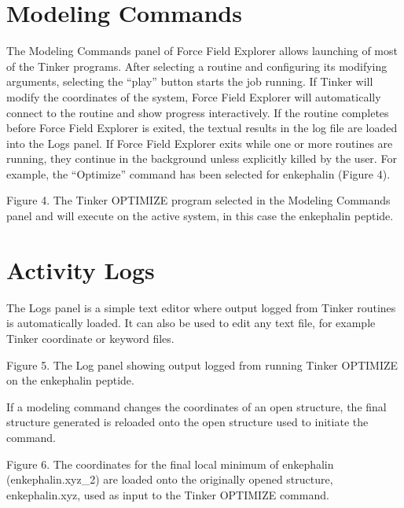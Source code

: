 \documentclass[letterpaper,11pt,english]{sphinxmanual}
\let\sphinxpxdimen\pdfpxdimen\else\newdimen\sphinxpxdimen
\begin{document}
\section{Modeling Commands}
\label{\detokenize{text/components:modeling-commands}}
The Modeling Commands panel of Force Field Explorer allows launching of most of the Tinker programs. After selecting a routine and configuring its modifying arguments, selecting the “play” button starts the job running. If Tinker will modify the coordinates of the system, Force Field Explorer will automatically connect to the routine and show progress interactively. If the routine completes before Force Field Explorer is exited, the textual results in the log file are loaded into the Logs panel. If Force Field Explorer exits while one or more routines are running, they continue in the background unless explicitly killed by the user. For example, the “Optimize” command has been selected for enkephalin (Figure 4).

\noindent\sphinxincludegraphics[width=625\sphinxpxdimen]{{figure4}.png}

Figure 4. The Tinker OPTIMIZE program selected in the Modeling Commands panel and will execute on the active system, in this case the enkephalin peptide.


\section{Activity Logs}
\label{\detokenize{text/components:activity-logs}}
The Logs panel is a simple text editor where output logged from Tinker routines is automatically loaded. It can also be used to edit any text file, for example Tinker coordinate or keyword files.

\noindent\sphinxincludegraphics[width=625\sphinxpxdimen]{{figure5}.png}

Figure 5. The Log panel showing output logged from running Tinker OPTIMIZE on the enkephalin peptide.

If a modeling command changes the coordinates of an open structure, the final structure generated is re\sphinxhyphen{}loaded onto the open structure used to initiate the command.

\noindent\sphinxincludegraphics[width=625\sphinxpxdimen]{{figure6}.png}

Figure 6.  The coordinates for the final local minimum of enkephalin (enkephalin.xyz\_2) are loaded onto the originally opened structure, enkephalin.xyz, used as input to the Tinker OPTIMIZE command.
\end{document}
